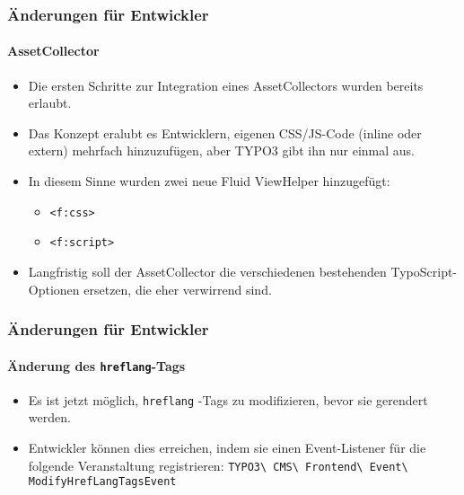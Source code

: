 
\begin{frame}[fragile]
	\frametitle{Änderungen für Entwickler}
	\framesubtitle{AssetCollector}

	\begin{itemize}
		\item Die ersten Schritte zur Integration eines AssetCollectors wurden bereits erlaubt.
		\item Das Konzept eralubt es Entwicklern, eigenen CSS/JS-Code (inline oder extern)
			mehrfach hinzuzufügen, aber TYPO3 gibt ihn nur einmal aus.
		\item In diesem Sinne wurden zwei neue Fluid ViewHelper hinzugefügt:
			\begin{itemize}
				\item \texttt{<f:css>}
				\item \texttt{<f:script>}
			\end{itemize}
		\item Langfristig soll der AssetCollector die verschiedenen bestehenden
			TypoScript-Optionen ersetzen, die eher verwirrend sind.
	\end{itemize}

\end{frame}


\begin{frame}[fragile]
	\frametitle{Änderungen für Entwickler}
	\framesubtitle{Änderung des \texttt{hreflang}-Tags}

	\lstset{basicstyle=\smaller\ttfamily}

	\begin{itemize}
		\item Es ist jetzt möglich, \texttt{hreflang} -Tags zu modifizieren, bevor sie gerendert werden.
		\item Entwickler können dies erreichen, indem sie einen Event-Listener für die folgende Veranstaltung registrieren:\newline
			\smaller
				\texttt{TYPO3\textbackslash
					CMS\textbackslash
					Frontend\textbackslash
					Event\textbackslash
					ModifyHrefLangTagsEvent}
			\normalsize
	\end{itemize}

\end{frame}

